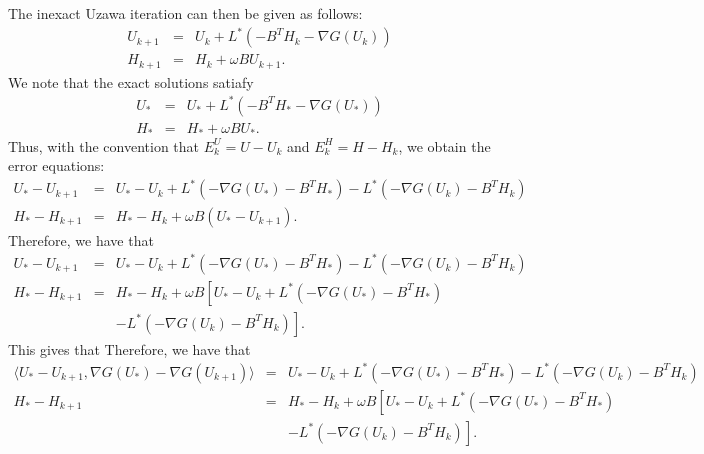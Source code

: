 \begin{itemize}
The inexact Uzawa iteration can then be given as follows: 
\begin{eqnarray*}
U_{k+1} &=& U_k + L^{*} (-B^T H_k - \nabla G(U_k)) \\
H_{k+1} &=& H_k + \omega B U_{k+1}. 
\end{eqnarray*}
We note that the exact solutions satiafy 
\begin{eqnarray*}
U_{*} &=& U_{*} + L^{*} (-B^T H_{*}-\nabla G (U_{*})) \\
H_{*} &=& H_{*} + \omega B U_{*}. 
\end{eqnarray*}
Thus, with the convention that $E_{k}^U = U - U_k$ and $E_{k}^H = H - H_k$, we obtain the error equations: 
\begin{eqnarray*}
U_* - U_{k+1} &=& U_* - U_k + L^{*} (-\nabla G(U_*) -B^T H_*) - L^{*} (-\nabla G(U_k) -B^T H_k)  \\
H_* - H_{k+1} &=& H_* - H_k + \omega B (U_* - U_{k+1}). 
\end{eqnarray*}
Therefore, we have that 
\begin{eqnarray*}
U_* - U_{k+1} &=& U_* - U_k + L^{*} (-\nabla G(U_*) -B^T H_*) - L^{*} (-\nabla G(U_k) -B^T H_k)  \\
H_* - H_{k+1} &=& H_* - H_k + \omega B \left [U_* - U_k + L^{*} (-\nabla G(U_*) -B^T H_*) \right. \\
&& \left. - L^{*} (-\nabla G(U_k) -B^T H_k) \right ]. 
\end{eqnarray*}
This gives that 
Therefore, we have that 
\begin{eqnarray*}
\langle U_* - U_{k+1}, \nabla G(U_*) - \nabla G(U_{k+1}) \rangle &=& U_* - U_k + L^{*} (-\nabla G(U_*) -B^T H_*) - L^{*} (-\nabla G(U_k) -B^T H_k)  \\
H_* - H_{k+1} &=& H_* - H_k + \omega B \left [U_* - U_k + L^{*} (-\nabla G(U_*) -B^T H_*) \right. \\
&& \left. - L^{*} (-\nabla G(U_k) -B^T H_k) \right ]. 
\end{eqnarray*}




\end{itemize}

